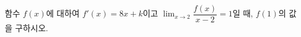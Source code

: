 함수 $f(x)$에 대하여 $f'(x)=8x+k$이고 $\displaystyle\lim_{x\to 2}\dfrac{f(x)}{x-2}=1$일 때, $f(1)$의 값을 구하시오. 
